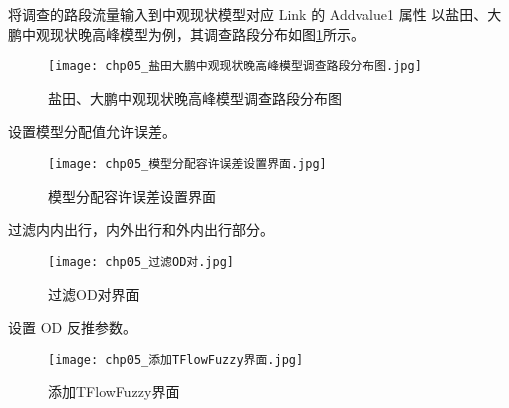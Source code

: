 \begin{nbeae}
\item 将调查的路段流量输入到中观现状模型对应 Link 的 Addvalue1 属性
以盐田、大鹏中观现状晚高峰模型为例，其调查路段分布如图\ref{fig:chp05_盐田大鹏中观现状晚高峰模型调查路段分布图}所示。

\begin{figure}[!ht]
  \centering
  \texttt{[image: chp05\_盐田大鹏中观现状晚高峰模型调查路段分布图.jpg]}
  \caption{盐田、大鹏中观现状晚高峰模型调查路段分布图\label{fig:chp05_盐田大鹏中观现状晚高峰模型调查路段分布图} }
\end{figure}

\clearpage
\item 设置模型分配值允许误差。


\begin{figure}[!ht]
  \centering
  \texttt{[image: chp05\_模型分配容许误差设置界面.jpg]}
  \caption{模型分配容许误差设置界面\label{fig:chp05_模型分配容许误差设置界面} }
\end{figure}

\item 过滤内内出行，内外出行和外内出行部分。


\begin{figure}[!ht]
  \centering
  \texttt{[image: chp05\_过滤OD对.jpg]}
  \caption{过滤OD对界面\label{fig:chp05_过滤OD对界面} }
\end{figure}

\item 设置 OD 反推参数。


\begin{figure}[!ht]
  \centering
  \texttt{[image: chp05\_添加TFlowFuzzy界面.jpg]}
  \caption{添加TFlowFuzzy界面\label{fig:chp05_添加TFlowFuzzy界面} }
\end{figure}


\end{nbeae}
